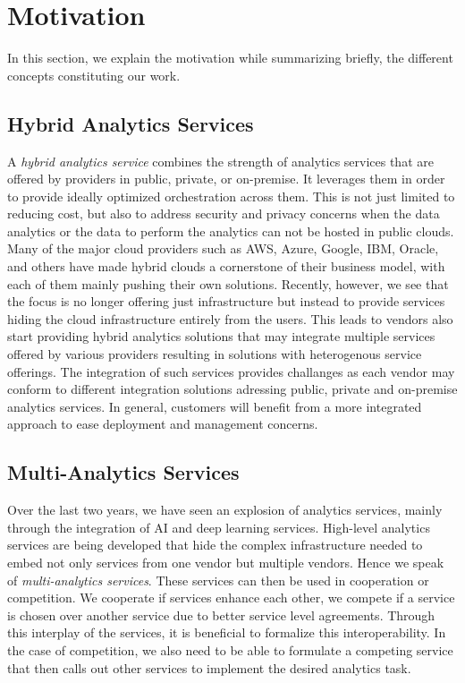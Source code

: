 
\section{Motivation}\label{s:background}

In this section, we explain the motivation  while summarizing
briefly, the different concepts constituting our work.

\subsection{Hybrid Analytics Services}

A {\em hybrid analytics service} combines the strength of analytics
services that are offered by providers in public, private, or
on-premise. It leverages them in order to provide ideally optimized
orchestration across them. This is not just limited to reducing cost,
but also to address security and privacy concerns when the data
analytics or the data to perform the analytics can not be hosted in
public clouds. Many of the major cloud providers such as AWS, Azure,
Google, IBM, Oracle, and others have made hybrid clouds a cornerstone
of their business model, with each of them mainly pushing their own
solutions. Recently, however, we see that the focus is no longer
offering just infrastructure but instead to provide services hiding the
cloud infrastructure entirely from the users.  This leads to vendors
also start providing hybrid analytics solutions that may integrate
multiple services offered by various providers resulting in solutions
with heterogenous service offerings. The integration of such services
provides challanges as each vendor may conform to different
integration solutions adressing public, private and on-premise
analytics services. In general, customers will benefit from a more
integrated approach to ease deployment and management concerns.

\subsection{Multi-Analytics Services}

Over the last two years, we have seen an explosion of analytics
services, mainly through the integration of AI and deep learning
services. High-level analytics services are being developed that hide the
complex infrastructure needed to embed not only services from one
vendor but multiple vendors. Hence we speak of {\em multi-analytics
  services}. These services can then be used in cooperation or
competition. We cooperate if services enhance each other, we compete
if a service is chosen over another service due to better service
level agreements. Through this interplay of the services, it is
beneficial to formalize this interoperability. In the case of competition,
we also need to be able to formulate a competing service that then
calls out other services to implement the desired analytics task.

